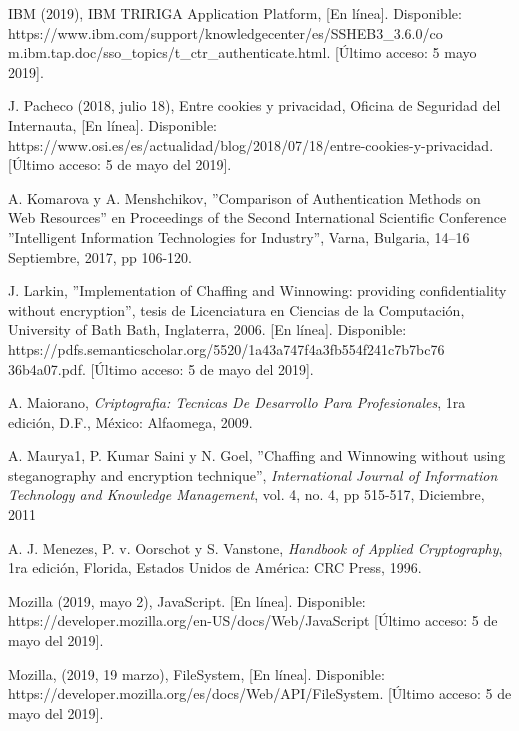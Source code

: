 \documentclass[12pt, a4paper, titlepage]{report}
\begin{document}
\begin{thebibliography}{20}
        IBM (2019), IBM TRIRIGA Application Platform, [En línea]. Disponible: https://www.ibm.com/support/knowledgecenter/es/SSHEB3\_3.6.0/co m.ibm.tap.doc/sso\_topics/t\_ctr\_authenticate.html. [Último acceso: 5 mayo 2019].
		
		J. Pacheco (2018, julio 18), Entre cookies y privacidad,  Oficina de Seguridad del Internauta, [En línea]. Disponible: https://www.osi.es/es/actualidad/blog/2018/07/18/entre-cookies-y-privacidad. [Último acceso: 5 de mayo del 2019].
		
	    A. Komarova y A. Menshchikov, ''Comparison of Authentication Methods on Web Resources'' en Proceedings of the Second International Scientific Conference ''Intelligent Information Technologies for Industry'', Varna, Bulgaria, 14–16 Septiembre, 2017, pp 106-120.
	    
    	J. Larkin, ''Implementation of Chaffing and Winnowing: providing confidentiality without encryption'', tesis de Licenciatura en Ciencias de la Computación, University of Bath Bath, Inglaterra, 2006. [En línea]. Disponible: 
    	https://pdfs.semanticscholar.org/5520/1a43a747f4a3fb554f241c7b7bc76 36b4a07.pdf. [Último acceso: 5 de mayo del 2019].
		
        A. Maiorano, \textit{Criptografia: Tecnicas De Desarrollo Para Profesionales}, 1ra edición, D.F., México: Alfaomega, 2009.
		
    	A. Maurya1, P. Kumar Saini y N. Goel, ''Chaffing and Winnowing without using steganography and encryption technique'', \textit{International Journal of Information Technology and Knowledge Management}, vol. 4, no. 4, pp 515-517, Diciembre, 2011
		
        A. J. Menezes, P. v. Oorschot y S. Vanstone, \textit{Handbook of Applied Cryptography}, 1ra edición, Florida, Estados Unidos de América: CRC Press, 1996.
		
		Mozilla (2019, mayo 2), JavaScript. [En línea]. Disponible:
		https://developer.mozilla.org/en-US/docs/Web/JavaScript [Último acceso: 5 de mayo del 2019].
		
        Mozilla, (2019, 19 marzo), FileSystem, [En línea]. Disponible: https://developer.mozilla.org/es/docs/Web/API/FileSystem. [Último acceso: 5 de mayo del 2019].
		

\end{thebibliography}
\end{document}
